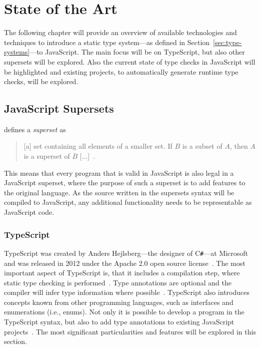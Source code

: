 \chapter{State of the Art}
\label{cha:state-of-the-art}

The following chapter will provide an overview of available technologies and techniques to introduce a static type system---as defined in Section~\ref{sec:type-systems}---to JavaScript. The main focus will be on TypeScript, but also other supersets will be explored. Also the current state of type checks in JavaScript will be highlighted and existing projects, to automatically generate runtime type checks, will be explored.

\section{JavaScript Supersets}
\label{sec:supersets}

\citeauthor{Term:Superset} defines a \emph{superset} as 
\begin{quote}
   [a] set containing all elements of a smaller set. If $B$ is a subset of $A$, then $A$ is a superset of $B$ [...]~\cite{Term:Superset}.
\end{quote}
This means that every program that is valid in JavaScript is also legal in a JavaScript superset, where the purpose of such a superset is to add features to the original language. As the source written in the supersets syntax will be compiled to JavaScript, any additional functionality needs to be representable as JavaScript code.

\subsection{TypeScript}
\label{sec:typescript}

TypeScript was created by Anders Hejlsberg---the designer of C\texttt{\#}---at Microsoft~\cite[p.~10]{MasteringTypeScript:Rozentals:2017} and was released in 2012 under the Apache 2.0 open source license~\cite[p.~xix]{ProTypeScript:Fenton:2014}. The most important aspect of TypeScript is, that it includes a compilation step, where static type checking is performed~\cite[p.~11]{MasteringTypeScript:Rozentals:2017}. Type annotations are optional and the compiler will infer type information where possible~\cite[p.~10]{TypeScriptBook:Syed:2017}. TypeScript also introduces concepts known from other programming languages, such as interfaces and enumerations (i.e., enums). Not only it is possible to develop a program in the TypeScript syntax, but also to add type annotations to existing JavaScript projects~\cite[p.~13]{MasteringTypeScript:Rozentals:2017}. The most significant particularities and features will be explored in this section.

